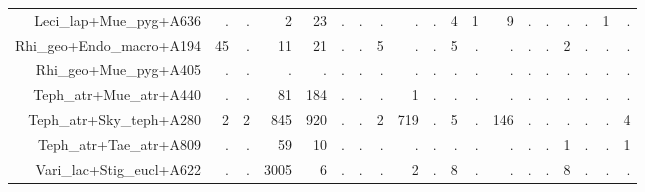 \documentclass[a4paper, 11]{article}\usepackage[]{graphicx}\usepackage[]{color}
\begin{document}
\begin{table}
\begin{tabular}{rrrrrrrrrrrrrrrrrrr}
  Leci\_lap+Mue\_pyg+A636 & . & . & 2 & 23 & . & . & . & . & . & 4 & 1 & 9 & . & . & . & . & 1 & . \\ 
  Rhi\_geo+Endo\_macro+A194 & 45 & . & 11 & 21 & . & . & 5 & . & . & 5 & . & . & . & . & 2 & . & . & . \\ 
  Rhi\_geo+Mue\_pyg+A405 & . & . & . & . & . & . & . & . & . & . & . & . & . & . & . & . & . & . \\ 
  Teph\_atr+Mue\_atr+A440 & . & . & 81 & 184 & . & . & . & 1 & . & . & . & . & . & . & . & . & . & . \\ 
  Teph\_atr+Sky\_teph+A280 & 2 & 2 & 845 & 920 & . & . & 2 & 719 & . & 5 & . & 146 & . & . & . & . & . & 4 \\ 
  Teph\_atr+Tae\_atr+A809 & . & . & 59 & 10 & . & . & . & . & . & . & . & . & . & . & 1 & . & . & 1 \\ 
  Vari\_lac+Stig\_eucl+A622 & . & . & 3005 & 6 & . & . & . & 2 & . & 8 & . & . & . & . & 8 & . & . & . \\ 
   \hline
\end{tabular}
\end{table}
\end{document}
